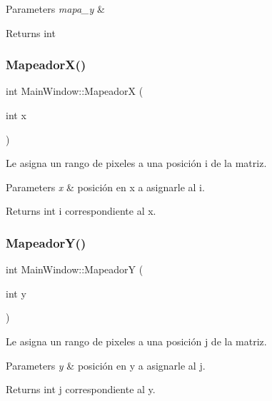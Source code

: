\begin{DoxyParams}{Parameters}
{\em mapa\+\_\+y} & \\
\hline
\end{DoxyParams}
\begin{DoxyReturn}{Returns}
int 
\end{DoxyReturn}
\mbox{\label{classMainWindow_ac1039de8ff9cd18a043f2774da95ae08}} 
\subsubsection{\texorpdfstring{Mapeador\+X()}{MapeadorX()}}
{\footnotesize\ttfamily int Main\+Window\+::\+MapeadorX (\begin{DoxyParamCaption}\item[{int}]{x }\end{DoxyParamCaption})}



Le asigna un rango de pixeles a una posición i de la matriz. 


\begin{DoxyParams}{Parameters}
{\em x} & posición en x a asignarle al i. \\
\hline
\end{DoxyParams}
\begin{DoxyReturn}{Returns}
int i correspondiente al x. 
\end{DoxyReturn}
\mbox{\label{classMainWindow_a7b527f7cf8ab67320613d78c0c1e2bd2}} 
\subsubsection{\texorpdfstring{Mapeador\+Y()}{MapeadorY()}}
{\footnotesize\ttfamily int Main\+Window\+::\+MapeadorY (\begin{DoxyParamCaption}\item[{int}]{y }\end{DoxyParamCaption})}



Le asigna un rango de pixeles a una posición j de la matriz. 


\begin{DoxyParams}{Parameters}
{\em y} & posición en y a asignarle al j. \\
\hline
\end{DoxyParams}
\begin{DoxyReturn}{Returns}
int j correspondiente al y. 
\end{DoxyReturn}
\mbox{\label{classMainWindow_a1dff511c9697cbcb60150894f480b9c8}} 
